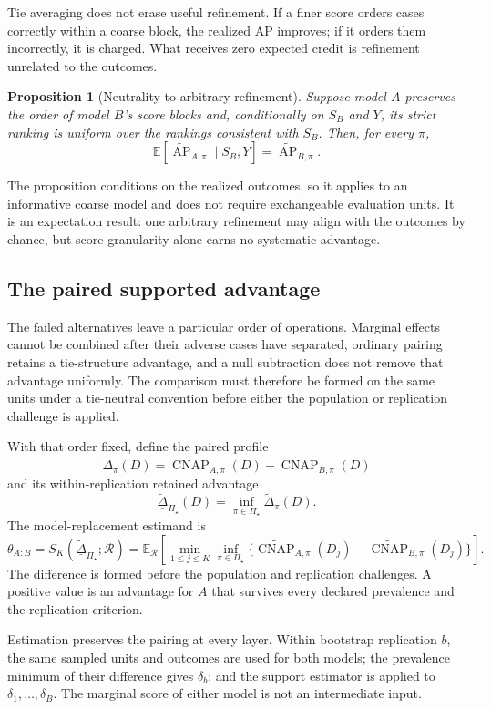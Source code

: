 \documentclass[11pt]{article}
\newcommand{\AP}{\operatorname{AP}}
\newcommand{\CNAP}{\operatorname{CNAP}}
\newcommand{\Regime}{\mathcal{R}}
\newcommand{\PSet}{\Pi_\star}
\newcommand{\E}{\mathbb{E}}
\newcommand{\APta}{\widetilde{\AP}}
\newcommand{\CNAPta}{\widetilde{\CNAP}}
\newcommand{\Dta}{\widetilde{\Delta}}
\newcommand{\RobDta}{\underline{\widetilde{\Delta}}_{\PSet}}
\newtheorem{proposition}{Proposition}
\theoremstyle{remark}
\begin{document}
Tie averaging does not erase useful refinement. If a finer score orders cases correctly within a coarse block, the realized AP improves; if it orders them incorrectly, it is charged. What receives zero expected credit is refinement unrelated to the outcomes.

\begin{proposition}[Neutrality to arbitrary refinement]
\label{prop:refinement}
Suppose model $A$ preserves the order of model $B$'s score blocks and, conditionally on $S_B$ and $Y$, its strict ranking is uniform over the rankings consistent with $S_B$. Then, for every $\pi$,
\[
\E\!\left[
\APta_{A,\pi}\mid S_B,Y
\right]
=
\APta_{B,\pi}.
\]
\end{proposition}

The proposition conditions on the realized outcomes, so it applies to an informative coarse model and does not require exchangeable evaluation units. It is an expectation result: one arbitrary refinement may align with the outcomes by chance, but score granularity alone earns no systematic advantage.

\subsection{The paired supported advantage}

The failed alternatives leave a particular order of operations. Marginal effects cannot be combined after their adverse cases have separated, ordinary pairing retains a tie-structure advantage, and a null subtraction does not remove that advantage uniformly. The comparison must therefore be formed on the same units under a tie-neutral convention before either the population or replication challenge is applied.

With that order fixed, define the paired profile
\[
\Dta_\pi(D)
=
\CNAPta_{A,\pi}(D)
-
\CNAPta_{B,\pi}(D)
\]
and its within-replication retained advantage
\[
\RobDta(D)
=
\inf_{\pi\in\PSet}\Dta_\pi(D).
\]
The model-replacement estimand is
\begin{equation}
\theta_{A:B}
=
S_K(\RobDta;\Regime)
=
\E_{\Regime}
\left[
\min_{1\leq j\leq K}
\inf_{\pi\in\PSet}
\{\CNAPta_{A,\pi}(D_j)-\CNAPta_{B,\pi}(D_j)\}
\right].
\label{eq:paired-estimand}
\end{equation}
The difference is formed before the population and replication challenges. A positive value is an advantage for $A$ that survives every declared prevalence and the replication criterion.

Estimation preserves the pairing at every layer. Within bootstrap replication $b$, the same sampled units and outcomes are used for both models; the prevalence minimum of their difference gives $\delta_b$; and the support estimator is applied to $\delta_1,\ldots,\delta_B$. The marginal score of either model is not an intermediate input.
\end{document}
